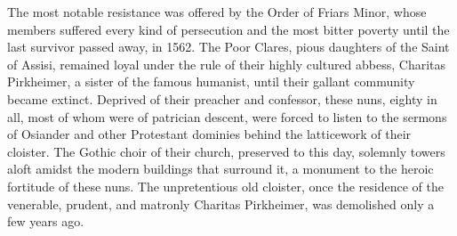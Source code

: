 The most notable resistance was offered by the Order of Friars
Minor, whose members suffered every kind of persecution and the most
bitter poverty until the last survivor passed away, in 1562. The Poor
Clares, pious daughters of the Saint of Assisi, remained loyal under the
rule of their highly cultured abbess, Charitas Pirkheimer, a sister of the
famous humanist, until their gallant community became extinct.
Deprived of their preacher and confessor, these nuns, eighty in all,
most of whom were of patrician descent, were forced to listen to the
sermons of Osiander and other Protestant dominies behind the latticework
of their cloister. The Gothic choir of their church, preserved to
this day, solemnly towers aloft amidst the modern buildings that surround
it, a monument to the heroic fortitude of these nuns. The unpretentious
old cloister, once the residence of the venerable, prudent,
and matronly Charitas Pirkheimer, was demolished only a few years
ago.
